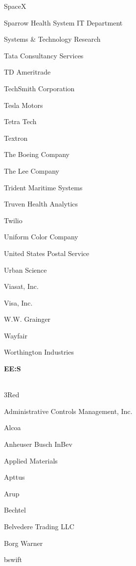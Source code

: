 \documentclass[twoside]{article}
\begin{document}
\begin{center}
\begin{multicols}{5}
\begin{FlushLeft}
\begin{compactitem}
\item SpaceX
\item Sparrow Health System IT Department
\item Systems \& Technology Research
\item Tata Consultancy Services
\item TD Ameritrade
\item TechSmith Corporation
\item Tesla Motors
\item Tetra Tech
\item Textron
\item The Boeing Company
\item The Lee Company
\item Trident Maritime Systems
\item Truven Health Analytics
\item Twilio
\item Uniform Color Company
\item United States Postal Service
\item Urban Science
\item Viasat, Inc.
\item Visa, Inc.
\item W.W. Grainger
\item Wayfair
\item Worthington Industries
\end{compactitem}
        \end{FlushLeft}
        \vspace{1em}
        {\fontsize{14}{16}\selectfont \bf EE:S}\\
        \vspace{-1em}
        ~\hrulefill~
        \vspace{-.9em}
        \begin{FlushLeft}
        \begin{compactitem}
        \item 3Red
\item Administrative Controls Management, Inc.
\item Alcoa
\item Anheuser Busch InBev
\item Applied Materials
\item Apttus
\item Arup
\item Bechtel
\item Belvedere Trading LLC
\item Borg Warner
\item bswift

\end{compactitem}
\end{FlushLeft}
\end{multicols}
\end{center}
\end{document}

